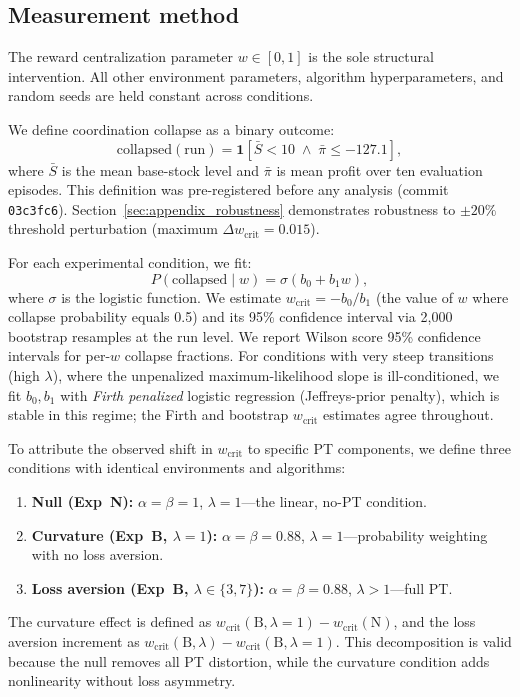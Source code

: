 \documentclass[letterpaper]{article}
\theoremstyle{plain}
\newcommand{\wcrit}{w_{\mathrm{crit}}}
\begin{document}
\subsection{Measurement method}
\label{sec:method}

The reward centralization parameter $w \in [0,1]$ is the sole structural
intervention.
All other environment parameters, algorithm hyperparameters, and random
seeds are held constant across conditions.

We define coordination collapse as a binary outcome:
\begin{equation}
  \mathrm{collapsed}(\text{run}) = \mathbf{1}\!\left[
    \bar{S} < 10 \;\wedge\; \bar{\pi} \leq -127.1
  \right],
  \label{eq:collapse}
\end{equation}
where $\bar{S}$ is the mean base-stock level and $\bar{\pi}$ is mean
profit over ten evaluation episodes.
This definition was pre-registered before any analysis (commit
\texttt{03c3fc6}).
Section~\ref{sec:appendix_robustness} demonstrates robustness to $\pm 20\%$
threshold perturbation (maximum $\Delta\wcrit = 0.015$).

For each experimental condition, we fit:
\begin{equation}
  P(\mathrm{collapsed} \mid w) = \sigma(b_0 + b_1 w),
  \label{eq:logistic}
\end{equation}
where $\sigma$ is the logistic function.
We estimate $\wcrit = -b_0/b_1$ (the value of $w$ where collapse
probability equals 0.5) and its 95\% confidence interval via 2,000
bootstrap resamples at the run level.
We report Wilson score 95\% confidence intervals for per-$w$ collapse
fractions. For conditions with very steep transitions (high $\lambda$), where the
unpenalized maximum-likelihood slope is ill-conditioned, we fit
$b_0,b_1$ with \emph{Firth penalized} logistic regression (Jeffreys-prior
penalty), which is stable in this regime; the Firth and bootstrap $\wcrit$
estimates agree throughout.

To attribute the observed shift in $\wcrit$ to specific PT components, we
define three conditions with identical environments and algorithms:
\begin{enumerate}
  \item \textbf{Null (Exp~N):} $\alpha{=}\beta{=}1$, $\lambda{=}1$---the
        linear, no-PT condition.
  \item \textbf{Curvature (Exp~B, $\lambda{=}1$):}
        $\alpha{=}\beta{=}0.88$, $\lambda{=}1$---probability weighting
        with no loss aversion.
  \item \textbf{Loss aversion (Exp~B, $\lambda \in \{3,7\}$):}
        $\alpha{=}\beta{=}0.88$, $\lambda > 1$---full PT.
\end{enumerate}
The curvature effect is defined as
$\wcrit(\text{B},\lambda{=}1) - \wcrit(\text{N})$,
and the loss aversion increment as
$\wcrit(\text{B},\lambda) - \wcrit(\text{B},\lambda{=}1)$.
This decomposition is valid because the null removes all PT distortion,
while the curvature condition adds nonlinearity without loss asymmetry.
\end{document}
